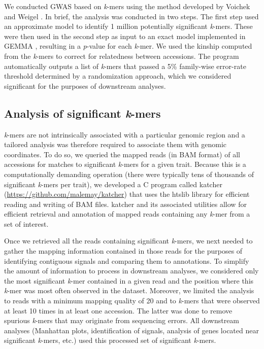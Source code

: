 \documentclass{article}
\begin{document}
We conducted GWAS based on \emph{k}-mers using the method developed by
Voichek and Weigel \cite{voichek2020}. In brief, the
analysis was conducted in two steps. The first step used an approximate model
to identify 1 million potentially significant \emph{k}-mers. These were then used in
the second step as input to an exact model implemented in GEMMA \citep{zhou2012}, resulting
in a \emph{p}-value for each \emph{k}-mer. We
used the kinship computed from the \emph{k}-mers to correct for relatedness
between accessions. The program automatically outputs a list of \emph{k}-mers
that passed a 5\% family-wise error-rate threshold determined by a
randomization approach, which we considered significant for the purposes of
downstream analyses.

\subsection*{Analysis of significant \emph{k}-mers}

\emph{k}-mers are not intrinsically associated with a particular genomic region
and a tailored analysis was therefore required to associate them with genomic
coordinates. To do so, we queried the mapped reads (in BAM format) of all accessions for matches
to significant \emph{k}-mers for a given trait. Because this is a
computationally demanding operation (there were typically tens of thousands of
significant \emph{k}-mers per trait), we developed a C program called katcher
(\url{https://github.com/malemay/katcher}) that
uses the htslib library \citep{bonfield2021} for efficient reading and
writing of BAM files. katcher and its associated utilities allow for efficient
retrieval and annotation of mapped reads containing any \emph{k}-mer from a set
of interest.

Once we retrieved all the reads containing significant \emph{k}-mers, we next
needed to gather the mapping information contained in those reads for the
purposes of identifying contiguous signals and comparing them to annotations. To
simplify the amount of information to process in downstream analyses, we
considered only the most significant \emph{k}-mer contained in a given read and
the position where this \emph{k}-mer was most often observed in
the dataset. Moreover, we limited the analysis to reads with a minimum mapping
quality of 20 and to \emph{k}-mers that were observed at least 10 times in at
least one accession. The latter was done to remove spurious \emph{k}-mers that may originate
from sequencing errors. All downstream analyses (Manhattan plots,
identification of signals, analysis of genes located near significant
\emph{k}-mers, etc.) used this processed set of significant \emph{k}-mers.
\end{document}
